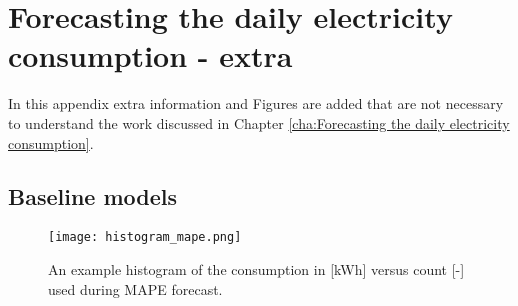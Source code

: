 \chapter{Forecasting the daily electricity consumption - extra}
\label{app:B}

In this appendix extra information and Figures are added that are not necessary to understand the work discussed in Chapter \ref{cha:Forecasting the daily electricity consumption}.

\section{Baseline models}

 \begin{figure}
	\centering
	\texttt{[image: histogram\_mape.png]}
	\caption{An example histogram of the consumption in [kWh] versus count [-] used during MAPE forecast.}
	\label{fig:histogram_mape}
\end{figure}





